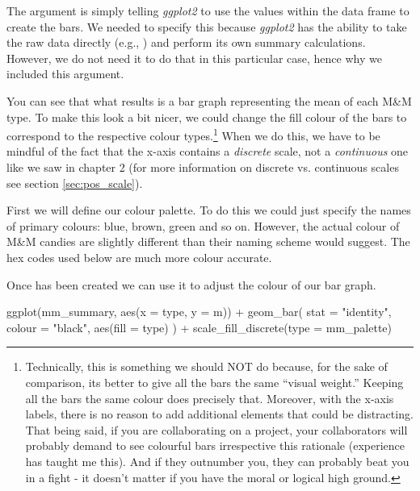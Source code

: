 The argument  is simply telling \textit{ggplot2} to use the values within the  data frame to create the bars.  We needed to specify this because \textit{ggplot2} has the ability to take the raw data directly (e.g., ) and perform its own summary calculations. However, we do not need it to do that in this particular case, hence why we included this argument.

You can see that what results is a bar graph representing the mean of each M\&M type. To make this look a bit nicer, we could change the fill colour of the bars to correspond to the respective colour types.\footnote{Technically, this is something we should NOT do because, for the sake of comparison, its better to give all the bars the same ``visual weight.'' Keeping all the bars the same colour does precisely that. Moreover, with the x-axis labels, there is no reason to add additional elements that could be distracting. That being said, if you are collaborating on a project, your collaborators will probably demand to see colourful bars irrespective this rationale (experience has taught me this). And if they outnumber you, they can probably beat you in a fight - it doesn't matter if you have the moral or logical high ground.} When we do this, we have to be mindful of the fact that the x-axis contains a \textit{discrete} scale, not a \textit{continuous} one like we saw in chapter 2 (for more information on discrete vs. continuous scales see section \ref{sec:pos_scale}).

First we will define our colour palette. To do this we could just specify the names of primary colours: blue, brown, green and so on. However, the actual colour of M\&M candies are slightly different than their naming scheme would suggest. The hex codes used below are much more colour accurate.


\vspace{1em}

Once  has been created we can use it to adjust the colour of our bar graph.

\begin{inR}
ggplot(mm_summary, aes(x = type, y = m)) +
  geom_bar(
    stat = "identity",
    colour = "black",
    aes(fill = type)
  ) +
  scale_fill_discrete(type = mm_palette)
\end{inR}

